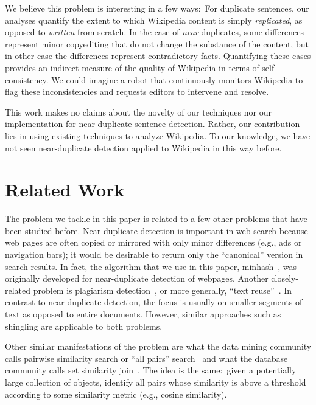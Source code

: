\documentclass[letterpaper]{article}
\begin{document}
We believe this problem is interesting in a few ways:\ 
For duplicate sentences,
our analyses quantify the extent to which Wikipedia content is simply
{\it replicated}, as opposed to {\it written} from scratch. 
In the case of {\it near} duplicates, some differences represent
minor copyediting that do not change the substance of the content, but
in other case the differences 
represent contradictory facts. Quantifying these cases
provides an indirect measure of the quality of Wikipedia in terms of
self consistency. We could imagine a robot that continuously monitors
Wikipedia to flag these inconsistencies and requests editors
to intervene and resolve.

This work makes no claims about the novelty of our
techniques nor our implementation for near-duplicate sentence
detection. Rather, our contribution lies in using existing techniques
to analyze Wikipedia. To our knowledge, we have not seen
near-duplicate detection applied to Wikipedia in this way before.

\section{Related Work}

The problem we tackle in this paper is related to a few other problems
that have been studied before. Near-duplicate detection is important
in web search because web pages are often copied or mirrored with only
minor differences (e.g., ads or navigation bars); it would be
desirable to return only the ``canonical'' version in search
results. In fact, the algorithm that we use in this paper,
minhash~\cite{broder:resemblance}, was originally developed for
near-duplicate detection of webpages. Another closely-related problem
is plagiarism detection~\cite{}, or more generally, ``text
reuse''~\cite{seo:dct,bendersky:timeline}. In contrast to near-duplicate detection, the
focus is usually on smaller segments of text as opposed to entire
documents. However, similar approaches such as shingling are
applicable to both problems.

Other similar manifestations of the problem are what the data mining
community calls pairwise similarity search or ``all pairs''
search~\cite{Bayardo_etal_WWW2007} and what the database community
calls set similarity join~\cite{Vernica_etal_SIGMOD2010}. The idea is the same:\ given a
potentially large collection of objects, identify all pairs whose
similarity is above a threshold according to some similarity metric
(e.g., cosine similarity).
\end{document}
